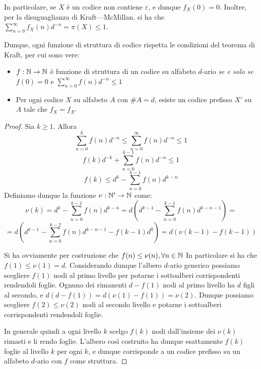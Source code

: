 \begin{observation}{}
  In particolare, se \(X\) è un codice non contiene \(\varepsilon\), e dunque \(f_X(0) = 0\).
  Inoltre, per la disuguaglianza di Kraft---McMillan, si ha che \(\sum_{n=0}^\infty f_X(n)d^{-n} = \pi(X) \leq 1\).
  
  Dunque, ogni funzione di struttura di codice rispetta le condizioni del teorema di Kraft, per cui sono vere:

  \begin{itemize}
    \item \(f: \mathbb{N} \to \mathbb{N}\) è funzione di struttura di un codice su alfabeto \(d\)-ario \textit{se e solo se} \(f(0) = 0\) e \(\sum_{n=0}^\infty f(n)d^{-n} \leq 1\)
    \item Per ogni codice \(X\) su alfabeto \(A\) con \(\#A = d\), esiste un codice prefisso \(X'\) su \(A\) tale che \(f_X = f_{X'}\)
  \end{itemize}
  
\end{observation}

\begin{proof}
  Sia \(k \geq 1\). Allora 
  \[\sum_{n=0}^{k}f(n)d^{-n} \leq \sum_{n=0}^{\infty}f(n)d^{-n} \leq 1 \]
  \[ f(k)d^{-k} + \sum_{n=0}^{k-1}f(n)d^{-n} \leq 1\]
  \[ f(k)\leq d^{k}-\sum_{n=0}^{k-1}f(n)d^{k-n}\]
  Definiamo dunque la funzione \(\nu: \mathbb{N}' \to \mathbb{N}\) come:
  \[\nu(k)=d^k-\sum_{n=0}^{k-1}f(n)d^{k-n} = d(d^{k-1}-\sum_{n=0}^{k-1}f(n)d^{k-n-1}) = \]
  \[= d(d^{k-1}-\sum_{n=0}^{k-2}f(n)d^{k-n-1}-f(k-1)d^{0}) = d(\nu(k-1)-f(k-1))\]

  Si ha ovviamente per costruzione che \(f(n)\leq\nu(n), \forall n \in \mathbb{N}\)
  In particolare si ha che \(f(1) \leq \nu(1) = d\).
  Considerando dunque l'albero \(d\)-ario generico possiamo scegliere \(f(1)\) nodi al primo livello per potarne i sottoalberi corrispondenti rendendoli foglie.
  Ognuno dei rimanenti \(d - f(1)\) nodi al primo livello ha \(d\) figli al secondo, e \(d(d-f(1))=d(\nu(1)- f(1)) = \nu(2)\).
  Dunque possiamo scegliere \(f(2) \leq \nu(2)\) nodi al secondo livello e potarne i sottoalberi corrispondenti rendendoli foglie.

  In generale quindi a ogni livello \(k\) scelgo \(f(k)\) nodi dall'insieme dei \(\nu(k)\) rimasti e li rendo foglie.
  L'albero così costruito ha dunque esattamente \(f(k)\) foglie al livello \(k\) per ogni \(k\), e dunque corrisponde a un codice prefisso su un alfabeto \(d\)-ario con \(f\) come struttura.
\end{proof}

